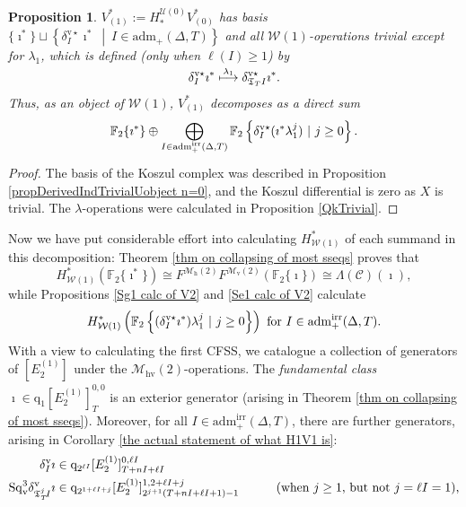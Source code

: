 \documentclass[11pt]{amsart} \renewcommand{\baselinestretch}{1.2}
\theoremstyle{plain}
\newtheorem{prop}[thm]{Proposition}
\numberwithin{equation}{section} %
\theoremstyle{plain}
\newtheorem{prop}[thm]{Proposition}
\numberwithin{equation}{chapter} %
\newcommand{\scrC}{\mathscr{C}}
\newcommand{\calU}{\mathcal{U}}
\newcommand{\calw}{\mathcal{W}}
\newcommand{\calmv}{\mathcal{M}\dver}
\newcommand{\calmh}{\mathcal{M}\dhor}
\newcommand{\calMhv}{\mathcal{M}_\mathrm{hv}}
\newcommand{\CommOperad}{{\scrC}}
\newcommand{\quadgrad}[1]{\mathrm{q}_{#1}}
\newcommand{\aDT}{\mathrm{adm}_+(\Delta,T)}
\newcommand{\aDTirr}{\mathrm{adm}_+^\mathrm{irr}(\Delta,T)}
\newcommand{\F}{\mathbb{F}}
\newcommand{\Ftwo}{\F_2}
\newcommand{\TOP}{\mathfrak{T}}
\newcommand{\E}[5]{[E^{#1}_{#2}#3]^{#4}_{#5}}
\newcommand{\uver}{^\mathrm{v}}
\newcommand{\dver}{_\mathrm{v}}
\newcommand{\dhor}{_\mathrm{h}}
\newcommand{\Sqv}{\mathrm{Sq}\dver}
\newcommand{\deltav}{\delta\uver}
\newcommand{\deltavstar}{\delta^{\mathrm{v}\star}}
\newcommand{\CFSS}{CFSS}
\begin{document}
\begin{Calculations of HWn}
\begin{prop}
\label{calc of V1 from W0 sphere}
$V^*_{(1)}:=H_*^{\calU(0)}V^*_{(0)}$ has basis $\{\imath^*\}\sqcup\left\{\deltavstar_I\imath^*\ \middle|\ I\in\aDT\right\}$ and all $\calw(1)$-operations trivial except for $\lambda_1$, which is defined (only when $\ell(I)\geq1$) by
\[\deltavstar_I\imath^*\overset{\smash{\lambda_1}}{\longmapsto }\deltavstar_{\TOP_T I}\imath^*.\]
Thus, as an object of $\calw(1)$, $V^*_{(1)}$ decomposes as a direct sum
\[\Ftwo \{\imath^*\}\oplus\bigoplus_{\smash{I\in \aDTirr}}\Ftwo \left\{\deltavstar_I(\imath^*\lambda_1^j)\ |\ j\geq0\right\}.\]
\end{prop}
\begin{proof}
The basis of the Koszul complex was described in Proposition \ref{propDerivedIndTrivialUobject n=0}, and the Koszul differential is zero as $X$ is trivial. The $\lambda$-operations were calculated in Proposition \ref{QkTrivial}.
\end{proof}
Now we have put considerable effort into calculating $H^*_{\calw(1)}$ of each summand in this decomposition: Theorem \ref{thm on collapsing of most sseqs} proves that
\[H^*_{\calw(1)}(\Ftwo \{\imath^*\})\cong F^{\calmh(2)}F^{\calmv(2)}(\Ftwo \{\imath\})\cong \Lambda(\CommOperad)(\imath),\]
while Propositions \ref{Sg1 calc of V2} and \ref{Se1 calc of V2} calculate
\[H^*_{\calw(1)}\left(\Ftwo \left\{(\deltavstar_I\imath^*)\lambda_1^j\ |\ j\geq0\right\}\right)\textup{ for $I\in\aDTirr$.}\]
With a view to calculating the first \CFSS,
we catalogue a collection of generators of $\E{(1)}{2}{}{}{}$ under the $\calMhv(2)$-operations. The \emph{fundamental class} $\imath\in 
\quadgrad{1}\E{(1)}{2}{}{0,0}{T}$ is an exterior generator (arising in Theorem \ref{thm on collapsing of most sseqs}). %
Moreover, for all $I\in\aDTirr$, there are further generators, arising in Corollary \ref{the actual statement of what H1V1 is}:
\begin{alignat}{2}
\label{first generator}\deltav_I\imath&\in \quadgrad{2^{\ell I}}\E{(1)}{2}{}{0,\ell I}{T+nI+\ell I}&\qquad&\\
\Sqv^{3}\deltav_{\TOP_T^j\!I}\imath&\in 
\quadgrad{2^{1+\ell I+j}}\E{(1)}{2}{}{1,2+\ell I+j}{2^{j+1}(T+nI+\ell I+1)-1}
&\qquad&\textup{(when $j\geq1$, but not $j=\ell I=1$),}\\

\end{alignat}
\end{Calculations of HWn}
\end{document}
